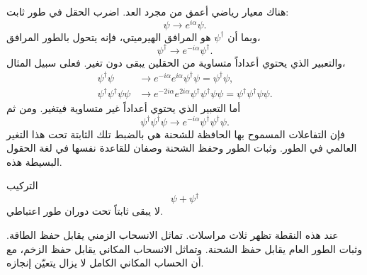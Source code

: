 هناك معيار رياضي أعمق من مجرد العد. اضرب الحقل في طور ثابت:
\begin{equation}
\psi\longrightarrow e^{i\alpha}\psi.
\end{equation}
وبما أن \(\psi^\dagger\) هو المرافق الهيرميتي، فإنه يتحول بالطور المرافق،
\begin{equation}
\psi^\dagger\longrightarrow e^{-i\alpha}\psi^\dagger.
\end{equation}
والتعبير الذي يحتوي أعداداً متساوية من الحقلين يبقى دون تغير. فعلى سبيل المثال،
\begin{align}
\psi^\dagger\psi
&\longrightarrow
e^{-i\alpha}e^{i\alpha}\psi^\dagger\psi
=\psi^\dagger\psi,\\
\psi^\dagger\psi^\dagger\psi\psi
&\longrightarrow
e^{-2i\alpha}e^{2i\alpha}
\psi^\dagger\psi^\dagger\psi\psi
=\psi^\dagger\psi^\dagger\psi\psi.
\end{align}
أما التعبير الذي يحتوي أعداداً غير متساوية فيتغير. ومن ثم
\begin{equation}
\psi^\dagger\psi^\dagger\psi
\longrightarrow
e^{-i\alpha}\psi^\dagger\psi^\dagger\psi.
\end{equation}
فإن التفاعلات المسموح بها الحافظة للشحنة هي بالضبط تلك الثابتة تحت هذا التغير العالمي في الطور. وثبات الطور وحفظ الشحنة وصفان للقاعدة نفسها في لغة الحقول البسيطة هذه.

التركيب
\begin{equation}
\psi+\psi^\dagger
\end{equation}
لا يبقى ثابتاً تحت دوران طور اعتباطي.

\begin{classroomqa}
\end{classroomqa}

\begin{classroomqa}
\end{classroomqa}

عند هذه النقطة تظهر ثلاث مراسلات. تماثل الانسحاب الزمني يقابل حفظ الطاقة. وثبات الطور العام يقابل حفظ الشحنة. وتماثل الانسحاب المكاني يقابل حفظ الزخم، مع أن الحساب المكاني الكامل لا يزال يتعيّن إنجازه.

